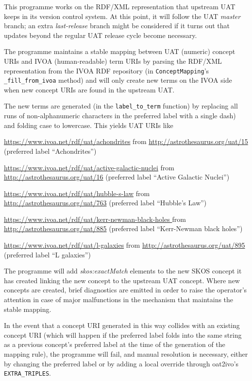 \documentclass[11pt,a4paper]{ivoa}
\newcommand{\vocterm}[1]{\emph{\color{termcolor}#1}}
\begin{document}
This programme works on the RDF/XML representation that upstream UAT
keeps in its version control system.  At this point, it will follow the
UAT \emph{master} branch; an extra \emph{last-release} branch might be
considered if it turns out that updates beyond the regular UAT release
cycle become necessary.

The programme maintains a stable mapping between UAT (numeric) concept
URIs and IVOA (human-readable) term URIs by parsing the RDF/XML
representation from the IVOA RDF repository (in \verb|ConceptMapping|'s
\verb|_fill_from_ivoa| method) and will only create new terms on the
IVOA side when new concept URIs are found in the upstream UAT.

The new terms are generated (in the \verb|label_to_term| function) by
replacing all runs of non-alphanumeric characters in the preferred label
with a single dash) and folding case to lowercase.  This yields UAT URIs
like

\begin{bigdescription}
\item[\url{https://www.ivoa.net/rdf/uat/achondrites}] from
\url{http://astrothesaurus.org/uat/15} (preferred label ``Achondrites'')
\item[\url{https://www.ivoa.net/rdf/uat/active-galactic-nuclei}]
from \url{http://astrothesaurus.org/uat/16} (preferred label ``Active
Galactic Nuclei'')
\item[\url{https://www.ivoa.net/rdf/uat/hubble-s-law}]
from \url{http://astrothesaurus.org/uat/763} (preferred label ``Hubble's
Law'')
\item[\url{https://www.ivoa.net/rdf/uat/kerr-newman-black-holes }]
from \url{http://astrothesaurus.org/uat/885} (preferred label
``Kerr-Newman black holes'')
\item[\url{https://www.ivoa.net/rdf/uat/l-galaxies}] from
\url{http://astrothesaurus.org/uat/895} (preferred label ``L galaxies'')
\end{bigdescription}

The programme will add \vocterm{skos:exactMatch} elements to the new
SKOS concept it has created linking the new concept to the upstream UAT
concept.  Where new concepts are created, brief diagnostics are emitted
in order to raise the operator's attention in case of major malfunctions
in the mechanism that maintains the stable mapping.

In the event that a concept URI generated in this way collides with an
existing concept URI (which will happen if the preferred label folds
into the same string as a previous concept's preferred label at the time
of the generation of the mapping rule), the programme will fail, and
manual resolution is necessary, either by changing the preferred label
or by adding a local override through oat2ivo's \verb|EXTRA_TRIPLES|.
\end{document}
